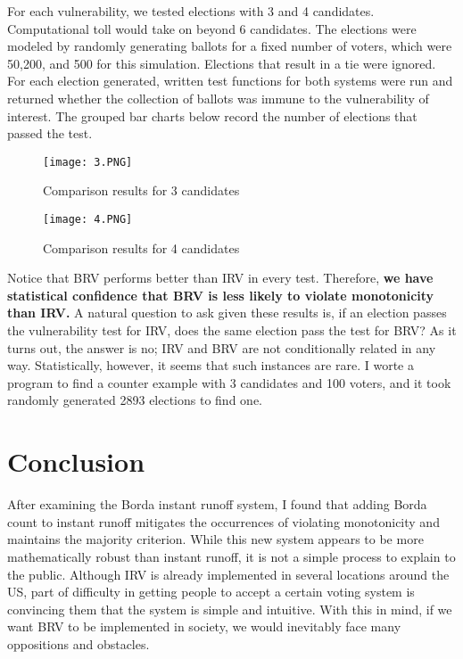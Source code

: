 \documentclass{article}
\begin{document}
For each vulnerability, we tested elections with 3 and 4 candidates. Computational toll would take on beyond 6 candidates. The elections were modeled by randomly generating ballots for a fixed number of voters, which were 50,200, and 500 for this simulation. Elections that result in a tie were ignored. For each election generated, written test functions for both systems were run and returned whether the collection of ballots was immune to the vulnerability of interest. The grouped bar charts below record the number of elections that passed the test.


\begin{figure}[H]
	
	\texttt{[image: 3.PNG]}
	\caption{Comparison results for 3 candidates}
	\label{fig1}
	
\end{figure}

\begin{figure}[H]
	
\texttt{[image: 4.PNG]}
\caption{Comparison results for 4 candidates}
\label{fig2}

\end{figure}

Notice that BRV performs better than IRV in every test. Therefore, \textbf{we have statistical confidence that BRV is less likely to violate monotonicity than IRV.} A natural question to ask given these results is, if an election passes the vulnerability test for IRV, does the same election pass the test for BRV? As it turns out, the answer is no; IRV and BRV are not conditionally related in any way. Statistically, however, it seems that such instances are rare. I worte a program to find a counter example with 3 candidates and 100 voters, and it took randomly generated 2893 elections to find one. 

\section{Conclusion}

After examining the Borda instant runoff system, I found that adding Borda count to instant runoff mitigates the occurrences of violating monotonicity and maintains the majority criterion. While this new system appears to be more mathematically robust than instant runoff, it is not a simple process to explain to the public. Although IRV is already implemented in several locations around the US, part of difficulty in getting people to accept a certain voting system is convincing them that the system is simple and intuitive. With this in mind, if we want BRV to be implemented in society, we would inevitably face many oppositions and obstacles.
\end{document}
